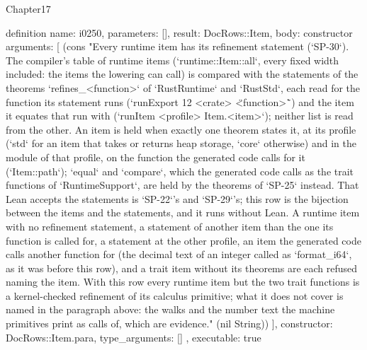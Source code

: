 \begin{lexlean}{Chapter17}
\begin{semanticmodule}
definition{
  name: i0250,
  parameters: [],
  result: DocRows::Item,
  body: constructor{
    arguments: [
      (cons "Every runtime item has its refinement statement (`SP-30`). The compiler's table of runtime items (`runtime::Item::all`, every fixed width included: the items the lowering can call) is compared with the statements of the theorems `refines_<function>` of `RustRuntime` and `RustStd`, each read for the function its statement runs (`runExport 12 <crate> \"<function>\"`) and the item it equates that run with (`runItem <profile> Item.<item>`); neither list is read from the other. An item is held when exactly one theorem states it, at its profile (`std` for an item that takes or returns heap storage, `core` otherwise) and in the module of that profile, on the function the generated code calls for it (`Item::path`); `equal` and `compare`, which the generated code calls as the trait functions of `RuntimeSupport`, are held by the theorems of `SP-25` instead. That Lean accepts the statements is `SP-22`'s and `SP-29`'s; this row is the bijection between the items and the statements, and it runs without Lean. A runtime item with no refinement statement, a statement of another item than the one its function is called for, a statement at the other profile, an item the generated code calls another function for (the decimal text of an integer called as `format_i64`, as it was before this row), and a trait item without its theorems are each refused naming the item. With this row every runtime item but the two trait functions is a kernel-checked refinement of its calculus primitive; what it does not cover is named in the paragraph above: the walks and the number text the machine primitives print as calls of, which are evidence." (nil String))
    ],
    constructor: DocRows::Item.para,
    type_arguments: []
  },
  executable: true
}


\end{semanticmodule}
\end{lexlean}
